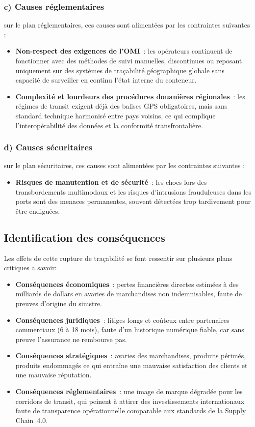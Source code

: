 \subsubsection*{c) Causes réglementaires}
   
  sur le plan réglementaires, ces causes sont alimentées par les contraintes suivantes :
\begin{itemize}
\item \textbf{Non-respect des exigences de l’OMI}~: les opérateurs continuent de fonctionner avec des méthodes de suivi manuelles, discontinues ou reposant uniquement sur des systèmes de traçabilité géographique globale sans capacité de surveiller en continu l'état interne du conteneur.
\item \textbf{Complexité et lourdeurs des procédures douanières régionales}~: les régimes de transit exigent déjà des balises GPS obligatoires, mais sans standard technique harmonisé entre pays voisins, ce qui complique l’interopérabilité des données et la conformité transfrontalière.
\end{itemize}

\subsubsection*{d) Causes sécuritaires}

  sur le plan sécuritaires, ces causes sont alimentées par les contraintes suivantes :
\begin{itemize}
\item \textbf{Risques de manutention et de sécurité}~: les chocs lors des transbordements multimodaux et les risques d’intrusions frauduleuses dans les ports sont des menaces permanentes, souvent détectées trop tardivement pour être endiguées.
\end{itemize}

\subsection{Identification des conséquences}

Les effets de cette rupture de traçabilité se font ressentir sur plusieurs plans critiques a savoir:
\begin{itemize}
\item \textbf{Conséquences économiques}~: pertes financières directes estimées à des milliards de dollars en avaries de marchandises non indemnisables, faute de preuves d’origine du sinistre.
\item \textbf{Conséquences juridiques}~: litiges longs et coûteux entre partenaires commerciaux (6 à 18 mois), faute d’un historique numérique fiable, car sans preuve l’assurance ne rembourse pas.
\item \textbf{Conséquences stratégiques}~: avaries des marchandises, produits périmés, produits endommagés ce qui entraîne une mauvaise satisfaction des clients et une mauvaise réputation.
\item \textbf{Conséquences réglementaires}~: une image de marque dégradée pour les corridors de transit, qui peinent à attirer des investissements internationaux faute de transparence opérationnelle comparable aux standards de la Supply Chain~4.0.
\end{itemize}

